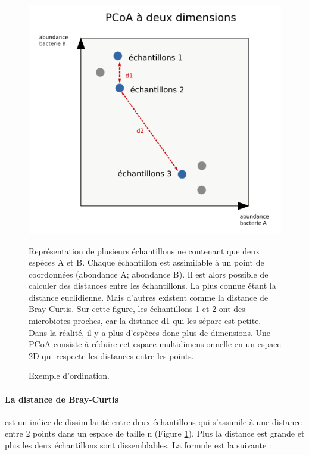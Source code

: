 \documentclass[12pt,a4paper]{article}
\begin{document}
\begin{figure}[!h]
\begin{center}
\includegraphics[scale=0.6]{img/pcoatuto.png}\hfill
\end{center}
\caption{Exemple d'ordination.}
Représentation de plusieurs échantillons ne contenant que deux espèces A et B. Chaque échantillon est assimilable à un point de coordonnées (abondance A; abondance B). Il est alors possible de calculer des distances entre les échantillons. La plus connue étant la distance euclidienne. Mais d'autres existent comme la distance de Bray-Curtis. Sur cette figure, les échantillons 1 et 2 ont des microbiotes proches, car la distance d1 qui les sépare est petite. Dans la réalité, il y a plus d'espèces donc plus de dimensions. Une PCoA consiste à réduire cet espace multidimensionnelle en un espace 2D qui respecte les distances entre les points. 
\label{pcoatuto}
\end{figure}
\newpage

\paragraph{La distance de Bray-Curtis} est un indice de dissimilarité entre deux échantillons qui s'assimile à une distance entre 2 points dans un espace de taille n (Figure \ref{pcoatuto}). Plus la distance est grande et plus les deux échantillons sont dissemblables. La formule est la suivante :
\end{document}
